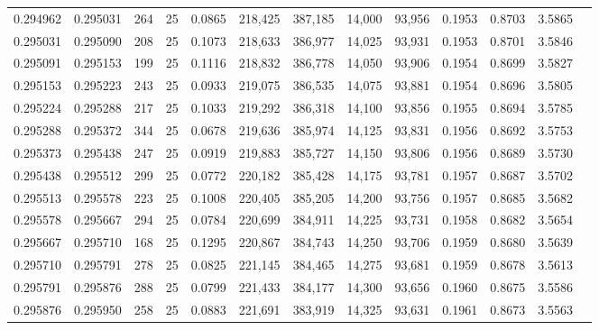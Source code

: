 \begin{tabular}{rrrrrrrrrrrrr}
0.294962 & 0.295031 &   264 &  25 &                                     0.0865 & 218,425 & 387,185 &  14,000 &  93,956 & 0.1953 & 0.8703 & 3.5865 \\
0.295031 & 0.295090 &   208 &  25 &                                     0.1073 & 218,633 & 386,977 &  14,025 &  93,931 & 0.1953 & 0.8701 & 3.5846 \\
0.295091 & 0.295153 &   199 &  25 &                                     0.1116 & 218,832 & 386,778 &  14,050 &  93,906 & 0.1954 & 0.8699 & 3.5827 \\
0.295153 & 0.295223 &   243 &  25 &                                     0.0933 & 219,075 & 386,535 &  14,075 &  93,881 & 0.1954 & 0.8696 & 3.5805 \\
0.295224 & 0.295288 &   217 &  25 &                                     0.1033 & 219,292 & 386,318 &  14,100 &  93,856 & 0.1955 & 0.8694 & 3.5785 \\
0.295288 & 0.295372 &   344 &  25 &                                     0.0678 & 219,636 & 385,974 &  14,125 &  93,831 & 0.1956 & 0.8692 & 3.5753 \\
0.295373 & 0.295438 &   247 &  25 &                                     0.0919 & 219,883 & 385,727 &  14,150 &  93,806 & 0.1956 & 0.8689 & 3.5730 \\
0.295438 & 0.295512 &   299 &  25 &                                     0.0772 & 220,182 & 385,428 &  14,175 &  93,781 & 0.1957 & 0.8687 & 3.5702 \\
0.295513 & 0.295578 &   223 &  25 &                                     0.1008 & 220,405 & 385,205 &  14,200 &  93,756 & 0.1957 & 0.8685 & 3.5682 \\
0.295578 & 0.295667 &   294 &  25 &                                     0.0784 & 220,699 & 384,911 &  14,225 &  93,731 & 0.1958 & 0.8682 & 3.5654 \\
0.295667 & 0.295710 &   168 &  25 &                                     0.1295 & 220,867 & 384,743 &  14,250 &  93,706 & 0.1959 & 0.8680 & 3.5639 \\
0.295710 & 0.295791 &   278 &  25 &                                     0.0825 & 221,145 & 384,465 &  14,275 &  93,681 & 0.1959 & 0.8678 & 3.5613 \\
0.295791 & 0.295876 &   288 &  25 &                                     0.0799 & 221,433 & 384,177 &  14,300 &  93,656 & 0.1960 & 0.8675 & 3.5586 \\
0.295876 & 0.295950 &   258 &  25 &                                     0.0883 & 221,691 & 383,919 &  14,325 &  93,631 & 0.1961 & 0.8673 & 3.5563 \\

\end{tabular}

